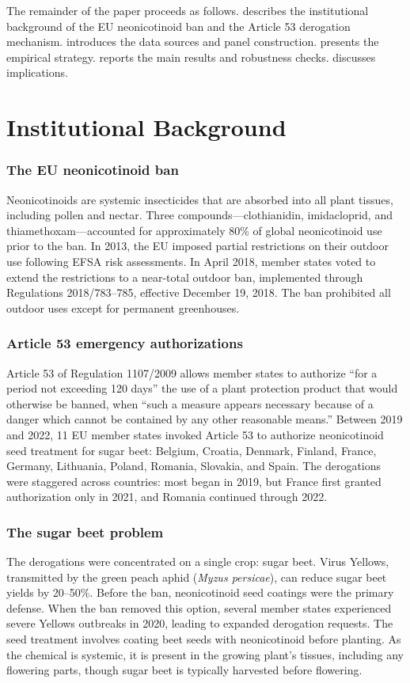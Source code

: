 \documentclass[12pt]{article}
\begin{document}
The remainder of the paper proceeds as follows.  describes the institutional background of the EU neonicotinoid ban and the Article 53 derogation mechanism.  introduces the data sources and panel construction.  presents the empirical strategy.  reports the main results and robustness checks.  discusses implications.

\section{Institutional Background}
\label{sec:background}

\subsubsection*{The EU neonicotinoid ban} Neonicotinoids are systemic insecticides that are absorbed into all plant tissues, including pollen and nectar. Three compounds---clothianidin, imidacloprid, and thiamethoxam---accounted for approximately 80\% of global neonicotinoid use prior to the ban. In 2013, the EU imposed partial restrictions on their outdoor use following EFSA risk assessments. In April 2018, member states voted to extend the restrictions to a near-total outdoor ban, implemented through Regulations 2018/783--785, effective December 19, 2018. The ban prohibited all outdoor uses except for permanent greenhouses.

\subsubsection*{Article 53 emergency authorizations} Article 53 of Regulation 1107/2009 allows member states to authorize ``for a period not exceeding 120 days'' the use of a plant protection product that would otherwise be banned, when ``such a measure appears necessary because of a danger which cannot be contained by any other reasonable means.'' Between 2019 and 2022, 11 EU member states invoked Article 53 to authorize neonicotinoid seed treatment for sugar beet: Belgium, Croatia, Denmark, Finland, France, Germany, Lithuania, Poland, Romania, Slovakia, and Spain. The derogations were staggered across countries: most began in 2019, but France first granted authorization only in 2021, and Romania continued through 2022.

\subsubsection*{The sugar beet problem} The derogations were concentrated on a single crop: sugar beet. Virus Yellows, transmitted by the green peach aphid (\textit{Myzus persicae}), can reduce sugar beet yields by 20--50\%. Before the ban, neonicotinoid seed coatings were the primary defense. When the ban removed this option, several member states experienced severe Yellows outbreaks in 2020, leading to expanded derogation requests. The seed treatment involves coating beet seeds with neonicotinoid before planting. As the chemical is systemic, it is present in the growing plant's tissues, including any flowering parts, though sugar beet is typically harvested before flowering.
\end{document}
